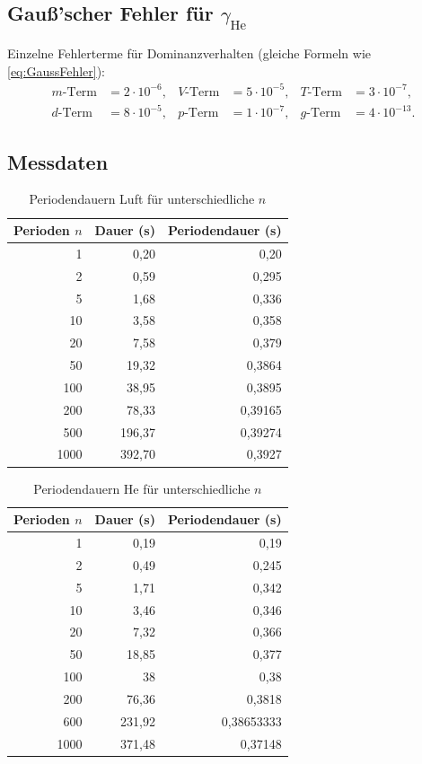 \documentclass[12pt,a4paper]{article}
\begin{document}
\subsection{Gauß'scher Fehler für $\gamma_{\mathrm{He}}$}

Einzelne Fehlerterme für Dominanzverhalten (gleiche Formeln wie \cref{eq:GaussFehler}):
\begin{align*}
m\text{-Term} &=2\cdot10^{-6},&
V\text{-Term} &=5\cdot10^{-5},&
T\text{-Term} &=3\cdot10^{-7},\\
d\text{-Term} &=8\cdot10^{-5},&
p\text{-Term} &=1\cdot10^{-7},&
g\text{-Term} &=4\cdot10^{-13}.
\end{align*}

\subsection{Messdaten}

\begin{table}[H]
\centering
\begin{tabular}{rrr}
\toprule
Perioden $n$ & Dauer (s) & Periodendauer (s)\\
\midrule
1 & 0,20 & 0,20\\
2 & 0,59 & 0,295\\
5 & 1,68 & 0,336\\
10 & 3,58 & 0,358\\
20 & 7,58 & 0,379\\
50 & 19,32 & 0,3864\\
100 & 38,95 & 0,3895\\
200 & 78,33 & 0,39165\\
500 & 196,37 & 0,39274\\
1000 & 392,70 & 0,3927\\
\bottomrule
\end{tabular}
  \caption{Periodendauern Luft für unterschiedliche $n$}
\end{table}

\begin{table}[H]
\centering
\begin{tabular}{rrr}
\toprule
Perioden $n$ & Dauer (s) & Periodendauer (s)\\
\midrule
1 & 0,19 & 0,19\\
2 & 0,49 & 0,245\\
5 & 1,71 & 0,342\\
10 & 3,46 & 0,346\\
20 & 7,32 & 0,366\\
50 & 18,85 & 0,377\\
100 & 38 & 0,38\\
200 & 76,36 & 0,3818\\
600 & 231,92 & 0,38653333\\
1000 & 371,48 & 0,37148\\
\bottomrule
\end{tabular}
  \caption{Periodendauern He für unterschiedliche $n$}
\end{table}
\end{document}

